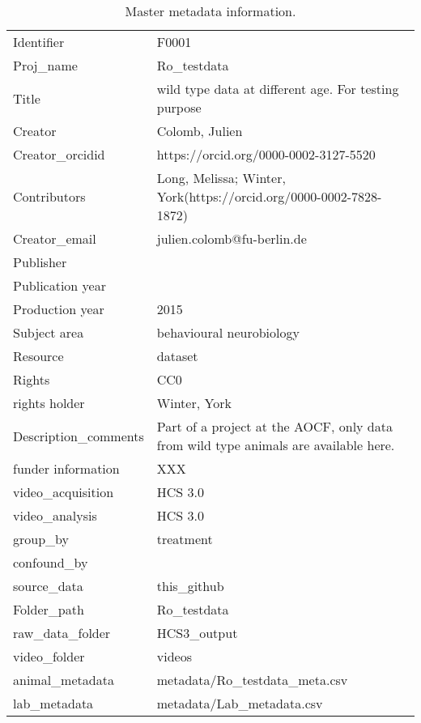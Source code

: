 \begin{table}[!htpb]
\centering
\begin{tabular}{|p{}|p{}|}
  \hline
  \hline
Identifier & F0001 \\ 
  Proj\_name & Ro\_testdata \\ 
  Title & wild type data at different age. For testing purpose \\ 
  Creator & Colomb, Julien \\ 
  Creator\_orcidid & https://orcid.org/0000-0002-3127-5520
 \\ 
  Contributors & Long, Melissa; Winter, York(https://orcid.org/0000-0002-7828-1872) \\ 
  Creator\_email & julien.colomb@fu-berlin.de \\ 
  Publisher &  \\ 
  Publication year &  \\ 
  Production year & 2015 \\ 
  Subject area & behavioural neurobiology \\ 
  Resource & dataset \\ 
  Rights & CC0 \\ 
  rights holder & Winter, York \\ 
  Description\_comments & Part of a project at the AOCF, only data from wild type animals are available here. \\ 
  funder information & XXX \\ 
  video\_acquisition & HCS 3.0 \\ 
  video\_analysis & HCS 3.0 \\ 
  group\_by & treatment \\ 
  confound\_by &  \\ 
  source\_data & this\_github \\ 
  Folder\_path & Ro\_testdata \\ 
  raw\_data\_folder & HCS3\_output \\ 
  video\_folder & videos \\ 
  animal\_metadata & metadata/Ro\_testdata\_meta.csv \\ 
  lab\_metadata & metadata/Lab\_metadata.csv \\ 
   \hline
\end{tabular}
\caption{Master metadata information.} 
\label{tab:project_metadata}
\end{table}
